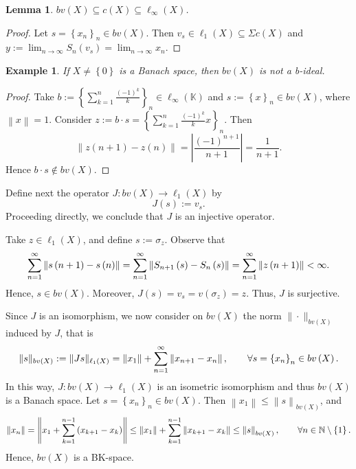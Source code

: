 \documentclass[14pt, a4paper]{article}  %
\providecommand{\llave}[1]{\left\lbrace #1\right\rbrace }
\providecommand{\pare}[1]{\left( #1\right) }
\providecommand{\norm}[1]{\left\lVert#1\right\rVert}
\providecommand{\abs}[1]{\left\lvert#1\right\rvert}
\providecommand{\Sum}[1]{\displaystyle\sum#1}
\newcommand{\tien}{\rightarrow}
\newcommand{\K}{\mathbb{K}}
\newcommand{\N}{\mathbb{N}}
\newtheorem{lemma}{Lemma}[section]
\newtheorem{example}{Example}[section]  %
\begin{document}
 \begin{lemma}\label{final5_0}
 	$bv\pare{X}\subseteq c\pare{X}\subseteq  \ell_{\infty}(X)$.  
 \end{lemma}
 \begin{proof}
 	Let $s=\llave{x_{n}}_{n}\in bv\pare{X}$. Then $v_{s}\in \ell_{1}\pare{X}\subseteq \Sigma c\pare{X}$ and $y:=\lim_{n\tien \infty}S_{n}\pare{v_{s}}=\lim_{n\tien \infty}x_{n}$.  
 \end{proof}
 
 

	\begin{example}
		If $X\neq \llave{0}$ is a Banach space, then $bv (X)$ is not a b-ideal.
	\end{example}
	\begin{proof}
Take $b:=\llave{\sum_{k=1}^{n}\frac{(-1)^{k}}{k}}_{n}\in \ell_{\infty}\pare{\K}$ and $s:=\llave{x}_{n}\in bv\pare{X}$, where $\norm{x}=1$. Consider $z:=b\cdot s=\llave{\sum_{k=1}^{n}\frac{(-1)^{k}}{k}x}_{n}$. Then
\begin{equation}
	\norm{z\pare{n+1}-z\pare{n}} = \abs{\frac{(-1)^{n+1}}{n+1}} = \frac{1}{n+1}.
\end{equation}
Hence $b\cdot s\notin bv\pare{X}$.
	\end{proof}
	
	 Define next the operator
	$J:bv\pare{X}\to \ell_{1}\pare{X}$ by
	\begin{equation}
		J(s):=v_{s}.
	\end{equation}
	Proceeding directly, we conclude that $J$ is an injective operator.
	
	Take $z\in \ell_{1}\pare{X}$, and define $s:=\sigma_{{z}}$. Observe that
	\begin{equation}
		\Sum_{n=1}^{\infty}\norm{s\pare{n+1}-s\pare{n}}=\Sum_{n=1}^{\infty}\norm{S_{n+1}\pare{s}-S_{n}\pare{s}}= \Sum_{n=1}^{\infty}\norm{z\pare{n+1}}<\infty.
	\end{equation}
	Hence, $s\in bv\pare{X}$. Moreover, $J\pare{s}=v_{s}=v\pare{\sigma_{z}}=z$. Thus, $J$ is surjective. 
 
Since $J$ is an isomorphism, we now consider on $bv\pare{X}$ the norm $\| \cdot \|_{bv\pare{X}}$ induced by $J$, that is 
\begin{equation}
	\|s\|_{bv\pare{X}} := \|J s\|_{\ell_{1}\pare{X}}=\norm{x_{1}}+\Sum_{n=1}^{\infty}\norm{x_{n+1}-x_{n}},\qquad    \forall s=\llave{x_{n}}_{n}\in bv\pare{X}.
\end{equation}
In this way, $J: bv\pare{X} \to \ell_{1}\pare{X}$ is an isometric isomorphism and thus $bv (X)$ is a Banach space. Let $s=\llave{x_{n}}_{n}\in bv\pare{X}$. Then $\norm{x_{1}}\leq \norm{s}_{bv\pare{X}}$, and
\begin{equation}\label{fin2}
	\norm{x_{n}}=\norm{x_{1}+\Sum_{k=1}^{n-1}\pare{x_{k+1}-x_{k}}}\leq \norm{x_{1}}+\Sum_{k=1}^{n-1}\norm{x_{k+1}-x_{k}}\leq \norm{s}_{bv\pare{X}},\qquad \forall n\in \N\setminus \llave{1}.
\end{equation}
Hence, $bv\pare{X}$ is a BK-space.  
\end{document}
